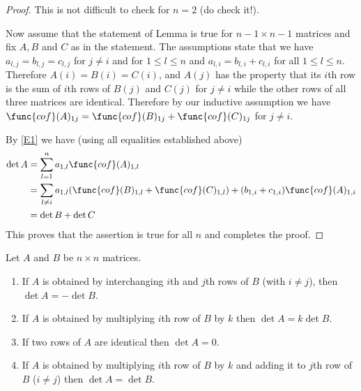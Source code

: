 \begin{proof} 
This is not difficult to check for $n=2$ (do check it!). 

Now assume that the statement of Lemma is true for $n-1\times n-1$ matrices and 
fix $A,B$ and $C$ as in the statement. 
The assumptions state that 
we have  $a_{l,j}=b_{l,j}=c_{l,j}$ for $j\neq i$ and for $1\leq l\leq n$
and $a_{l,i}=b_{l,i}+c_{l,i}$ for all $1\leq l\leq n$. 
Therefore $A(i)=B(i)=C(i)$, and $A(j)$ has the property that 
its $i$th row is the sum of $i$th rows of $B(j)$ and $C(j)$ for $j\neq i$ while the  other rows of all three matrices are identical.  
Therefore by our inductive assumption we have $\func{cof}(A)_{1j}=\func{cof}(B)_{1j}+\func{cof}(C)_{1j}$
for $j\neq i$. 

By \eqref{E1} we have (using all equalities established above) 
\begin{align*}
\det A&=\sum_{l=1}^n a_{1,l} \func{cof}(A)_{1,l}\\
 &=\sum_{l\neq i} a_{1,l}(\func{cof}(B)_{1,l}+\func{cof}(C)_{1,l})+ 
(b_{1,i}+c_{1,i})\func{cof}(A)_{1,i}\\
&=
\det B+\det C
\end{align*}
This proves that the assertion is true for all $n$ and completes the proof.  
\end{proof} 

\begin{theorem}{}\label{thm:T1} 
Let $A$ and $B$ be $n\times n$ matrices. 
\begin{enumerate}
\item If $A$ is obtained by interchanging $i$th and $j$th rows  of $B$ (with $i\neq j$), then $\det A=-\det B$. 
\item If $A$ is obtained by multiplying $i$th row of $B$ by $k$ then $\det A=k\det B$. 
\item If two rows of $A$ are identical then $\det A=0$. 
\item If $A$ is obtained by multiplying $i$th row of $B$ by $k$ and adding it to 
$j$th row of $B$ ($i\neq j$) then $\det A=\det B$. 
\end{enumerate}
\end{theorem}

